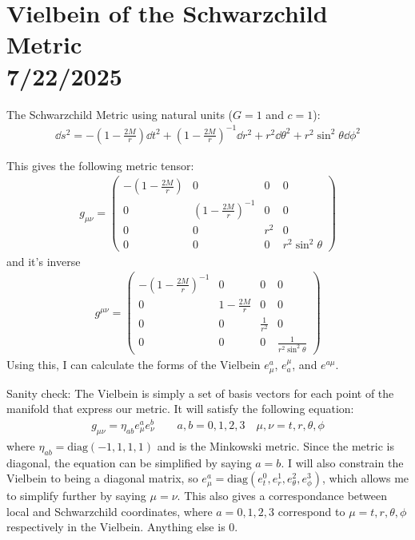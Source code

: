 \documentclass[12pt]{article}
\begin{document}
\section*{Vielbein of the Schwarzchild Metric \\ {\small 7/22/2025}}
The Schwarzchild Metric using natural units ($G = 1$ and $c = 1$):
\begin{align*}
  \dd{s}^2 = -\left(1 - \frac{2M}{r}\right)\dd{t}^2 + \left(1 - \frac{2M}{r}\right)^{-1}\dd{r}^2 + r^2\dd{\theta}^2 + r^2\sin^2{\theta}\dd{\phi}^2
\end{align*}

This gives the following metric tensor:
\begin{align*}
  g_{\mu\nu} =
  \begin{pmatrix}
  -\left(1 - \frac{2M}{r}\right) & 0 & 0 & 0 \\
  0 & \left(1 - \frac{2M}{r}\right)^{-1} & 0 & 0 \\
  0 & 0 & r^2 & 0 \\
  0 & 0 & 0 & r^2 \sin^2{\theta}
\end{pmatrix}
\end{align*}
and it's inverse
\begin{align*}
  g^{\mu\nu} =
  \begin{pmatrix}
  -\left(1 - \frac{2M}{r}\right)^{-1} & 0 & 0 & 0 \\
  0 & 1 - \frac{2M}{r} & 0 & 0 \\
  0 & 0 & \frac{1}{r^2} & 0 \\
  0 & 0 & 0 & \frac{1}{r^2 \sin^2{\theta}}
  \end{pmatrix}
\end{align*}
Using this, I can calculate the forms of the Vielbein $e^a_\mu$, $e^\mu_a$, and $e^{a\mu}$.

Sanity check: The Vielbein is simply a set of basis vectors for each point of the manifold that express our metric. It will satisfy the following equation:
\begin{align*}
  g_{\mu\nu} = \eta_{ab}e^a_\mu e^b_\nu \qquad a,b = 0,1,2,3 \quad \mu,\nu = t,r,\theta,\phi
\end{align*}
where $\eta_{ab} = \text{diag}(-1,1,1,1)$ and is the Minkowski metric. Since the metric is diagonal, the equation can be simplified by saying $a=b$. I will also constrain the Vielbein to being a diagonal matrix, so $e^a_\mu = \text{diag}(e^0_t,e^1_r,e^2_\theta,e^3_\phi)$, which allows me to simplify further by saying $\mu = \nu$. This also gives a correspondance between local and Schwarzchild coordinates, where $a = 0,1,2,3$ correspond to $\mu = t,r,\theta,\phi$ respectively in the Vielbein. Anything else is $0$.
\end{document}

